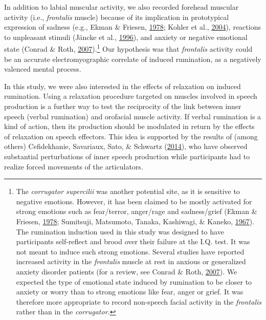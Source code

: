 \documentclass[a4paper,12pt,twoside,onecolumn,openright,final,oldfontcommands]{memoir}
\let\rmarkdownfootnote\footnote%
\def\footnote{\protect\rmarkdownfootnote}
\begin{document}
In addition to labial muscular activity, we also recorded forehead muscular activity (i.e., \emph{frontalis} muscle) because of its implication in prototypical expression of sadness (e.g., Ekman \& Friesen, \protect\hyperlink{ref-ekman_facial_1978}{1978}; Kohler et al., \protect\hyperlink{ref-kohler_differences_2004}{2004}), reactions to unpleasant stimuli (Jäncke et al., \protect\hyperlink{ref-Jancke1996}{1996}), and anxiety or negative emotional state (Conrad \& Roth, \protect\hyperlink{ref-conrad_muscle_2007}{2007}).\footnote{The \emph{corrugator supercilii} was another potential site, as it is sensitive to negative emotions. However, it has been claimed to be mostly activated for strong emotions such as fear/terror, anger/rage and sadness/grief (Ekman \& Friesen, \protect\hyperlink{ref-ekman_facial_1978}{1978}; Sumitsuji, Matsumoto, Tanaka, Kashiwagi, \& Kaneko, \protect\hyperlink{ref-sumitsuji_electromyographic_1967}{1967}). The rumination induction used in this study was designed to have participants self-reflect and brood over their failure at the I.Q. test. It was not meant to induce such strong emotions. Several studies have reported increased activity in the \emph{frontalis} muscle at rest in anxious or generalized anxiety disorder patients (for a review, see Conrad \& Roth, \protect\hyperlink{ref-conrad_muscle_2007}{2007}). We expected the type of emotional state induced by rumination to be closer to anxiety or worry than to strong emotions like fear, anger or grief. It was therefore more appropriate to record non-speech facial activity in the \emph{frontalis} rather than in the \emph{corrugator.}} Our hypothesis was that \emph{frontalis} activity could be an accurate electromyographic correlate of induced rumination, as a negatively valenced mental process.

In this study, we were also interested in the effects of relaxation on induced rumination. Using a relaxation procedure targeted on muscles involved in speech production is a further way to test the reciprocity of the link between inner speech (verbal rumination) and orofacial muscle activity. If verbal rumination is a kind of action, then its production should be modulated in return by the effects of relaxation on speech effectors. This idea is supported by the results of (among others) Cefidekhanie, Savariaux, Sato, \& Schwartz (\protect\hyperlink{ref-cefidekhanie_interaction_2014}{2014}), who have observed substantial perturbations of inner speech production while participants had to realize forced movements of the articulators.
\end{document}
